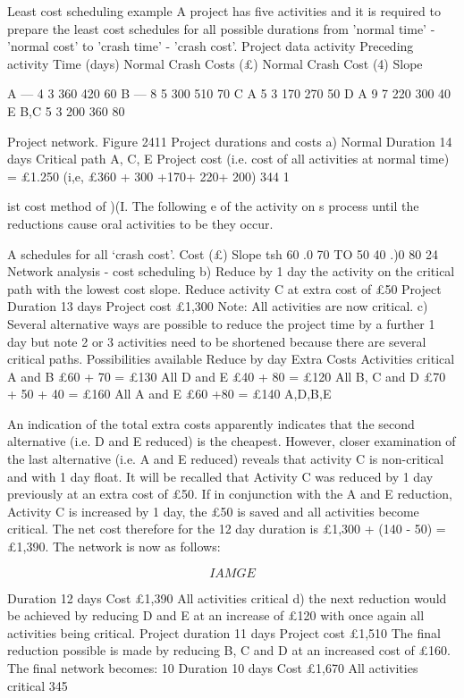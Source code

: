 \begin{itemize}
Least cost scheduling example A project has five activities and it is required to prepare the least cost schedules for all possible durations from 'normal time' - 'normal cost' to 'crash time' - 'crash cost'. 
Project data activity Preceding activity Time (days) Normal Crash Costs (£) Normal Crash Cost (4) Slope 

A — 4 3 360 420 60 
B — 8 5 300 510 70 
C A 5 3 170 270 50 
D A 9 7 220 300 40 
E B,C 5 3 200 360 80 

Project network. Figure 2411 
Project durations and costs a) Normal Duration 14 days  Critical path A, C, E Project cost (i.e. cost of all activities at normal time) = £1.250  (i,e, £360 + 300 +170+ 220+ 200) 
344 
1 


ist cost method of )(I. The following 
e of the activity on s process until the reductions cause oral activities to be they occur. 

A schedules for all `crash cost'. Cost (£) Slope 
tsh 
60 .0 70 TO 50 40 .)0 80 
24 Network analysis - cost scheduling 
b) Reduce by 1 day the activity on the critical path with the lowest cost slope. Reduce activity C at extra cost of £50 Project Duration 13 days  Project cost £1,300  Note: All activities are now critical. c) Several alternative ways are possible to reduce the project time by a further 1 day but note 2 or 3 activities need to be shortened because there are several critical paths. 
Possibilities available Reduce by day Extra Costs Activities critical 
A and B £60 + 70 = £130 All 
D and E £40 + 80 = £120 All 
B, C and D £70 + 50 + 40 = £160 All 
A and E £60 +80 = £140 A,D,B,E 

An indication of the total extra costs apparently indicates that the second alternative (i.e. D and E reduced) is the cheapest. 
However, closer examination of the last alternative (i.e. A and E reduced) reveals that activity C is non-critical and with 1 day float. 
It will be recalled that Activity C was reduced by 1 day previously at an extra cost of £50. 
If in conjunction with the A and E reduction, Activity C is increased by 1 day, the £50 is saved and all activities become critical. 
The net cost therefore for the 12 day duration is £1,300 + (140 - 50) = £1,390. The network is now as follows: 

\[IAMGE\]

Duration 12 days Cost £1,390 All activities critical 
d) the next reduction would be achieved by reducing D and E at an increase of £120 with once again all activities being critical. Project duration 11 days Project cost £1,510  The final reduction possible is made by reducing B, C and D at an increased cost of £160. The final network becomes: 
10 
Duration 10 days Cost £1,670 All activities critical 
345 




\end{itemize}
